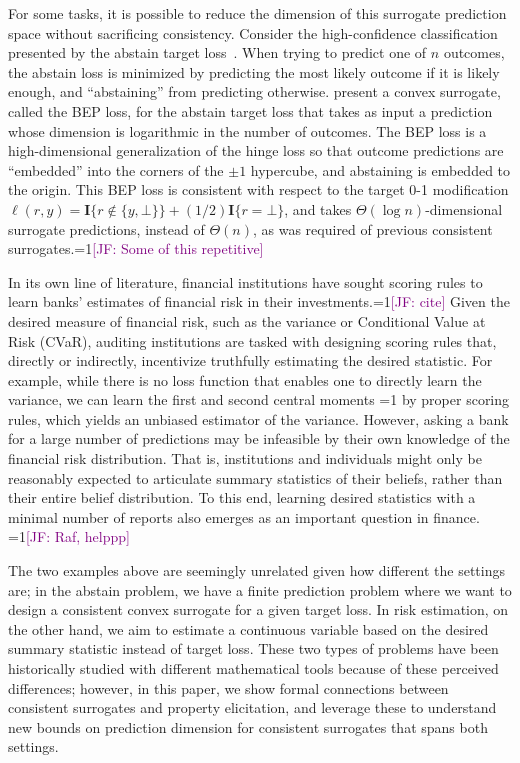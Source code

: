 \documentclass[anon,12pt]{colt2021} %
\newcommand{\Comments}{1}
\newcommand{\mynote}[2]{\ifnum\Comments=1\textcolor{#1}{#2}\fi}
\newcommand{\mytodo}[2]{\ifnum\Comments=1%
	\todo[linecolor=#1!80!black,backgroundcolor=#1,bordercolor=#1!80!black]{#2}\fi}
\newcommand{\jessie}[1]{\mynote{purple}{[JF: #1]}}
\newcommand{\jessiet}[1]{\mytodo{purple!20!white}{JF: #1}}
\newcommand{\Ind}[1]{\mathbf{I}\{{#1}\}}
\begin{document}
For some tasks, it is possible to reduce the dimension of this surrogate prediction space without sacrificing consistency.  
Consider the high-confidence classification presented by the abstain target loss~\citep{ramaswamy2012classification,ramaswamy2018consistent}.
When trying to predict one of $n$ outcomes, the abstain loss is minimized by predicting the most likely outcome if it is likely enough, and ``abstaining'' from predicting otherwise.
\citet{ramaswamy2016convex} present a convex surrogate, called the BEP loss, for the abstain target loss that takes as input a prediction whose dimension is logarithmic in the number of outcomes.
The BEP loss is a high-dimensional generalization of the hinge loss so that outcome predictions are ``embedded'' into the corners of the $\pm 1$ hypercube, and abstaining is embedded to the origin.
This BEP loss is consistent with respect to the target 0-1 modification $\ell(r,y) = \Ind{r \not \in \{y,\bot\}} + (1/2) \Ind{r = \bot}$, and takes $\Theta(\log n)$-dimensional surrogate predictions, instead of $\Theta(n)$, as was required of previous consistent surrogates.\jessie{Some of this repetitive}


In its own line of literature, financial institutions have sought scoring rules to learn banks' estimates of financial risk in their investments.\jessie{cite}
Given the desired measure of financial risk, such as the variance or Conditional Value at Risk (CVaR), auditing institutions are tasked with designing scoring rules that, directly or indirectly, incentivize truthfully estimating the desired statistic.
For example, while there is no loss function that enables one to directly learn the variance, we can learn the first and second central moments \jessiet{how much detail to share?} by proper scoring rules, which yields an unbiased estimator of the variance.
However, asking a bank for a large number of predictions may be infeasible by their own knowledge of the financial risk distribution.
That is, institutions and individuals might only be reasonably expected to articulate summary statistics of their beliefs, rather than their entire belief distribution.
To this end, learning desired statistics with a minimal number of reports also emerges as an important question in finance.
\jessie{Raf, helppp}


The two examples above are seemingly unrelated given how different the settings are; in the abstain problem, we have a finite prediction problem where we want to design a consistent convex surrogate for a given target loss.
In risk estimation, on the other hand, we aim to estimate a continuous variable based on the desired summary statistic instead of target loss.
These two types of problems have been historically studied with different mathematical tools because of these perceived differences; however, in this paper, we show formal connections between consistent surrogates and property elicitation, and leverage these to understand new bounds on prediction dimension for consistent surrogates that spans both settings. 
\end{document}

